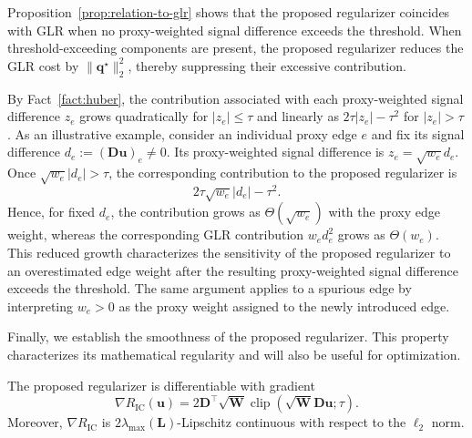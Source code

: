 Proposition~\ref{prop:relation-to-glr} shows that the proposed regularizer coincides with GLR when no proxy-weighted signal difference exceeds the threshold.
When threshold-exceeding components are present, the proposed regularizer reduces the GLR cost by $\|\mathbf{q}^{\star}\|_2^2$, thereby suppressing their excessive contribution.

\begin{remark}
\label{rem:weight-sensitivity}
By Fact~\ref{fact:huber}, the contribution associated with each proxy-weighted signal difference $z_e$ grows quadratically for $|z_e|\leq\tau$ and linearly as $2\tau|z_e|-\tau^2$ for $|z_e|>\tau$.
As an illustrative example, consider an individual proxy edge $e$ and fix its signal difference $d_e:=(\mathbf{D}\mathbf{u})_e\neq0$.
Its proxy-weighted signal difference is $z_e=\sqrt{w_e}d_e$.
Once $\sqrt{w_e}|d_e|>\tau$, the corresponding contribution to the proposed regularizer is
\begin{equation}
2\tau\sqrt{w_e}|d_e|-\tau^2.
\label{eq:weight-sensitivity-edge-cost}
\end{equation}
Hence, for fixed $d_e$, the contribution grows as $\Theta(\sqrt{w_e})$ with the proxy edge weight, whereas the corresponding GLR contribution $w_ed_e^2$ grows as $\Theta(w_e)$.
This reduced growth characterizes the sensitivity of the proposed regularizer to an overestimated edge weight after the resulting proxy-weighted signal difference exceeds the threshold.
The same argument applies to a spurious edge by interpreting $w_e>0$ as the proxy weight assigned to the newly introduced edge.
\end{remark}

Finally, we establish the smoothness of the proposed regularizer.
This property characterizes its mathematical regularity and will also be useful for optimization.

\begin{proposition}
\label{prop:mathematical-properties}
The proposed regularizer is differentiable with gradient
\begin{equation}
\nabla R_{\mathrm{IC}}(\mathbf{u})
=
2
\mathbf{D}^{\top}\sqrt{\mathbf{W}}
\operatorname{clip}
\left(
\sqrt{\mathbf{W}}\mathbf{D}\mathbf{u};
\tau
\right).
\label{eq:regularizer-gradient}
\end{equation}
Moreover, $\nabla R_{\mathrm{IC}}$ is $2\lambda_{\max}(\mathbf{L})$-Lipschitz continuous with respect to the $\ell_2$ norm.
\end{proposition}

